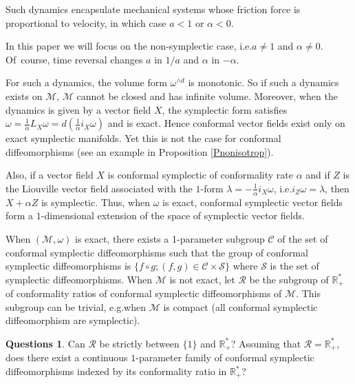 \documentclass[10pt]{amsart}
\theoremstyle{definition}
\newtheorem*{questions*}{Questions}
\def\R{\mathbb{R}}
\def\cC{{\mathcal C}}
\def\cM{{\mathcal M}}
\def\cR{{\mathcal R}}
\def\cS{{\mathcal S}}
\providecommand{\eg}{e.g.}\providecommand{\ie}{i.e.}\providecommand{\etc}{etc.}\providecommand{\resp}{resp.}\providecommand{\cf}{cf.}
\begin{document}
Such dynamics encapsulate mechanical systems whose friction force is proportional to velocity, in which case $a<1$ or $\alpha<0$.

In this paper we will focus on the non-symplectic case, \ie $a \neq 1$ and $\alpha \neq 0$. Of~course, time reversal changes $a$ in $1/a$ and $\alpha$ in $-\alpha$.

For such a dynamics, the volume form $\omega^{\wedge d}$ is monotonic. So if such a dynamics exists on $\cM$, $\cM$ cannot be closed and has infinite volume. Moreover, when the dynamics is given by a vector field $X$, the symplectic form satisfies $\omega=\frac{1}{\alpha} L_X\omega= d\left(\frac{1}{\alpha}i_X\omega\right)$ and is exact. Hence conformal vector fields exist only on exact symplectic manifolds. Yet this is not the case for conformal diffeomorphisms (see an example in Proposition \ref{Pnonisotrop}).

Also, if a vector field $X$ is conformal symplectic of conformality rate $\alpha$ and if $Z$ is the Liouville vector field associated with the $1$-form $\lambda= - \frac{1}{\alpha}i_X\omega$, \ie $i_Z\omega = \lambda$, then $X+\alpha Z$ is symplectic. Thus, when $\omega$ is exact, conformal symplectic vector fields form a $1$-dimensional extension of the space of symplectic vector fields.

When $(\cM, \omega)$ is exact, there exists a 1-parameter subgroup $\cC$ of the set of conformal symplectic diffeomorphisms such that the group of conformal symplectic diffeomorphisms is $\{f\circ g; (f, g)\in \cC\times\cS\}$ where $\cS$ is the set of symplectic diffeomorphisms. When $\cM$ is not exact, let $\cR$ be the subgroup of $\R_+^*$ of conformality ratios of conformal symplectic diffeomorphisms of $\cM$. This subgroup can be trivial, \eg when $\cM$ is compact (all conformal symplectic diffeomorphism are symplectic).

\begin{questions*}
Can $\cR$ be strictly between $\{1\}$ and $\R^*_+$? Assuming that $\cR=\R^*_+$, does there exist a continuous $1$-para\-meter family of conformal symplectic diffeomorphisms indexed by its conformality ratio in $\R^*_+$?
\end{questions*}
\end{document}
